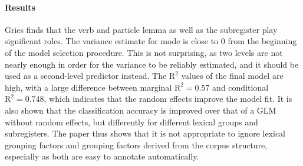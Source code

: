 \begin{svgraybox}
  \vspace{-\baselineskip}\paragraph{Results}\vspace{-0.5\baselineskip}

  Gries finds that the verb and particle lemma as well as the subregister play significant roles.
  The variance estimate for mode is close to 0 from the beginning of the model selection procedure.
  This is not surprising, as two levels are not nearly enough in order for the variance to be reliably estimated, and it should be used as a second-level predictor instead.
  The $\mathrm{R}^{\mathrm{2}}$ values of the final model are high, with a large difference between marginal $\mathrm{R}^{\mathrm{2}}=0.57$ and conditional $\mathrm{R}^{\mathrm{2}}=0.748$, which indicates that the random effects improve the model fit.
  It is also shown that the classification accuracy is improved over that of a GLM without random effects, but differently for different lexical groups and subregisters.
  The paper thus shows that it is not appropriate to ignore lexical grouping factors and grouping factors derived from the corpus structure, especially as both are easy to annotate automatically.

\end{svgraybox}

\newpage
